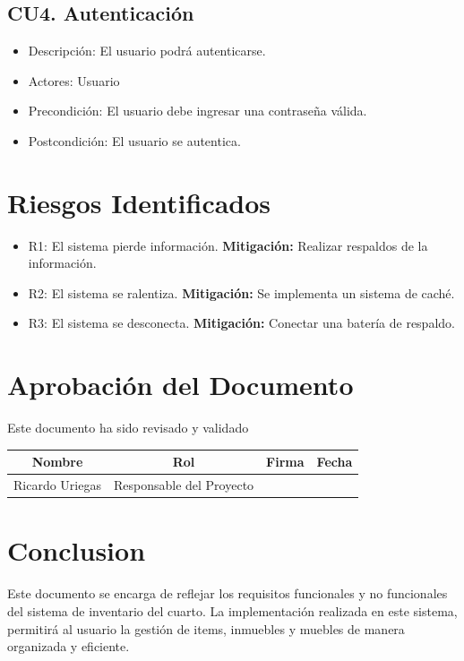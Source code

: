 \documentclass{article}
\begin{document}
\subsection{CU4. Autenticación}
\begin{itemize}
    \item Descripción: El usuario podrá autenticarse.
    \item Actores: Usuario
    \item Precondición: El usuario debe ingresar una contraseña válida.
    \item Postcondición: El usuario se autentica.
\end{itemize}

\section{Riesgos Identificados}
\begin{itemize}
    \item R1: El sistema pierde información.
    \subitem \textbf{Mitigación:} Realizar respaldos de la información.
    \item R2: El sistema se ralentiza.
    \subitem \textbf{Mitigación:} Se implementa un sistema de caché.
    \item R3: El sistema se desconecta.
    \subitem \textbf{Mitigación:} Conectar una batería de respaldo.
\end{itemize}

\section{Aprobación del Documento}
Este documento ha sido revisado y validado
\begin{table}[H]
    \centering
    \begin{tabular}{|c|c|c|c|}
        \hline
        \textbf{Nombre} & \textbf{Rol} & \textbf{Firma} & \textbf{Fecha} \\
        \hline
        Ricardo Uriegas & Responsable del Proyecto & &  \\
        \hline
    \end{tabular}
\end{table}

\section{Conclusion}
Este documento se encarga de reflejar los requisitos funcionales y no funcionales del sistema de inventario del cuarto. La implementación realizada en este sistema, permitirá al usuario la gestión de items, inmuebles y muebles de manera organizada y eficiente.
\end{document}
